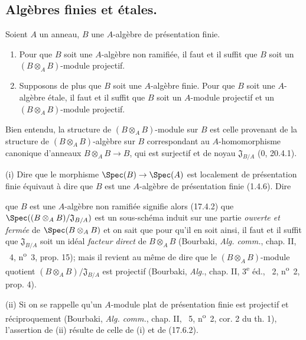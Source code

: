 \subsection{Algèbres finies et étales.}

\begin{proposition}[18.3.1]
\label{IV.18.3.1}
Soient $A$ un anneau, $B$ une $A$-algèbre de présentation finie.
\begin{enumerate}
  \item[(i)] Pour que $B$ soit une $A$-algèbre non ramifiée, il faut et il suffit que $B$ soit un $(B\otimes_A B)$-module projectif.
  \item[(ii)] Supposons de plus que $B$ soit une $A$-algèbre finie. Pour que $B$ soit une $A$-algèbre étale, il faut et il suffit que $B$ soit un $A$-module projectif et un $(B\otimes_A B)$-module projectif.
\end{enumerate}
\end{proposition}

Bien entendu, la structure de $(B\otimes_A B)$-module sur $B$ est celle provenant de la structure de $(B\otimes_A B)$-algèbre sur $B$ correspondant au $A$-homomorphisme canonique d'anneaux $B\otimes_A B\to B$, qui est surjectif et de noyau $\mathfrak J_{B/A}$ (0, 20.4.1).

(i) Dire que le morphisme $\Spec(B)\to\Spec(A)$ est localement de présentation finie équivaut à dire que $B$ est une $A$-algèbre de présentation finie (1.4.6). Dire


que $B$ est une $A$-algèbre non ramifiée signifie alors (17.4.2) que $\Spec((B\otimes_A B)/\mathfrak J_{B/A})$ est un sous-schéma induit sur une partie \emph{ouverte et fermée} de $\Spec(B\otimes_A B)$ et on sait que pour qu'il en soit ainsi, il faut et il suffit que $\mathfrak J_{B/A}$ soit un idéal \emph{facteur direct} de $B\otimes_A B$ (Bourbaki, \emph{Alg. comm.}, chap. II, \textsection~4, n\textsuperscript{o}~3, prop. 15); mais il revient au même de dire que le $(B\otimes_A B)$-module quotient $(B\otimes_A B)/\mathfrak J_{B/A}$ est projectif (Bourbaki, \emph{Alg.}, chap. II, 3\textsuperscript{e} éd., \textsection~2, n\textsuperscript{o}~2, prop. 4).

(ii) Si on se rappelle qu'un $A$-module plat de présentation finie est projectif et réciproquement (Bourbaki, \emph{Alg. comm.}, chap. II, \textsection~5, n\textsuperscript{o}~2, cor. 2 du th. 1), l'assertion de (ii) résulte de celle de (i) et de (17.6.2).

